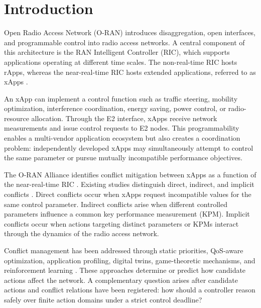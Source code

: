 \documentclass[pdflatex,sn-mathphys-num,iicol,oneside]{sn-jnl}
\begin{document}

\maketitle

\section{Introduction}
\label{sec:introduction}

Open Radio Access Network (O-RAN) introduces disaggregation, open
interfaces, and programmable control into radio access networks.
A central component of this architecture is the RAN Intelligent
Controller (RIC), which supports applications operating at different
time scales. The non-real-time RIC hosts rApps, whereas the
near-real-time RIC hosts extended applications, referred to as xApps
\cite{polese2023oran}.

An xApp can implement a control function such as traffic steering,
mobility optimization, interference coordination, energy saving,
power control, or radio-resource allocation. Through the E2
interface, xApps receive network measurements and issue control
requests to E2 nodes. This programmability enables a multi-vendor
application ecosystem but also creates a coordination problem:
independently developed xApps may simultaneously attempt to control
the same parameter or pursue mutually incompatible performance
objectives.

The O-RAN Alliance identifies conflict mitigation between xApps as a
function of the near-real-time RIC \cite{oran2024conflict}. Existing
studies distinguish direct, indirect, and implicit conflicts
\cite{adamczyk2023conflict,wadud2024qacm}. Direct conflicts occur when
xApps request incompatible values for the same control parameter.
Indirect conflicts arise when different controlled parameters
influence a common key performance measurement (KPM). Implicit
conflicts occur when actions targeting distinct parameters or KPMs
interact through the dynamics of the radio access network.

Conflict management has been addressed through static priorities,
QoS-aware optimization, application profiling, digital twins,
game-theoretic mechanisms, and reinforcement learning
\cite{wadud2024qacm,prever2025pacifista,
giannopoulos2025comix,wadud2025mobility}. These approaches determine
or predict how candidate actions affect the network. A complementary
question arises after candidate actions and conflict relations have
been registered: how should a controller reason safely over finite
action domains under a strict control deadline?
\end{document}
